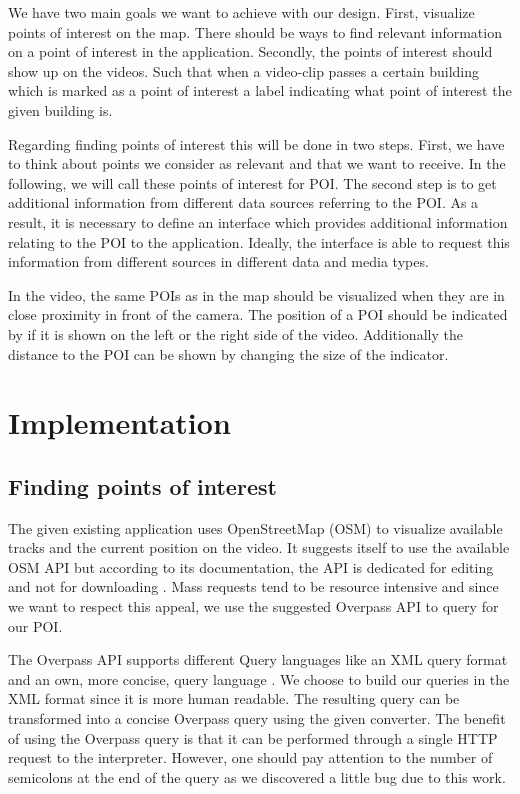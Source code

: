 \documentclass[journal]{IEEEtran}
\begin{document}
We have two main goals we want to achieve with our design. First, visualize points of interest on the map. There should be ways to find relevant information on a point of interest in the application. Secondly, the points of interest should show up on the videos. Such that when a video-clip passes a certain building which is marked as a point of interest a label indicating what point of interest the given building is. 

Regarding finding points of interest this will be done in two steps. First, we have to think about points we consider as relevant and that we want to receive. In the following, we will call these points of interest for POI.  The second step is to get additional information from different data sources referring to the POI. As a result, it is necessary to define an interface which provides additional information relating to the POI to the application. Ideally, the interface is able to request this information from different sources in different data and media types.

In the video, the same POIs as in the map should be visualized when they are in close proximity in front of the camera. The position of a POI should be indicated by if it is shown on the left or the right side of the video. Additionally the distance to the POI can be shown by changing the size of the indicator.

\section{Implementation}

\subsection{Finding points of interest}

The given existing application uses OpenStreetMap (OSM) to visualize available tracks and the current position on the video. It suggests itself to use the available OSM API but according to its documentation, the API is dedicated for editing and not for downloading \cite{osmdata}. Mass requests tend to be resource intensive and since we want to respect this appeal, we use the suggested Overpass API to query for our POI.

The Overpass API supports different Query languages like an XML query format and an own, more concise, query language \cite{overpass-lang}. We choose to build our queries in the XML format since it is more human readable. The resulting query can be transformed into a concise Overpass query using the given converter. The benefit of using the Overpass query is that it can be performed through a single HTTP request to the interpreter. However, one should pay attention to the number of semicolons at the end of the query as we discovered a little bug due to this work.
\end{document}

